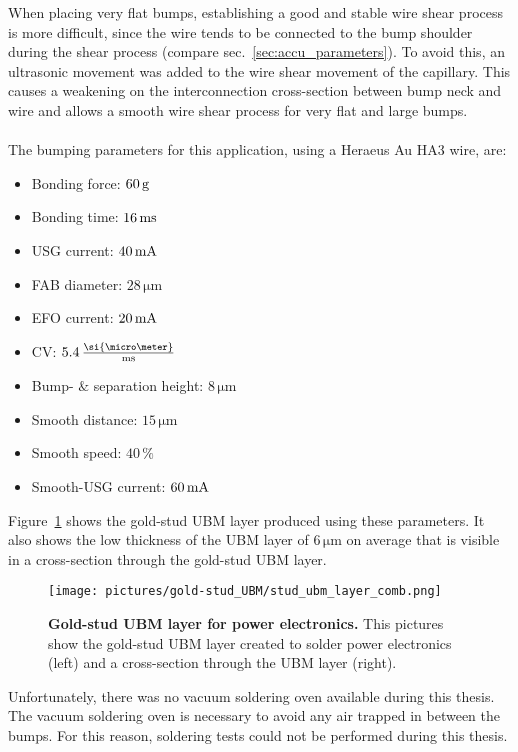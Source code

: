 When placing very flat bumps, establishing a good and stable wire shear process is more difficult, since the wire tends to be connected to the bump shoulder during the shear process (compare sec.~\ref{sec:accu_parameters}). To avoid this, an ultrasonic movement was added to the wire shear movement of the capillary. This causes a weakening on the interconnection cross-section between bump neck and wire and allows a smooth wire shear process for very flat and large bumps.\\
\\The bumping parameters for this application, using a Heraeus Au HA3 wire, are:
\begin{itemize}
\item Bonding force: $60\,\rm{g}$
\item Bonding time: $16\,\rm{ms}$
\item \ac{USG} current: $40\,\rm{mA}$
\item \ac{FAB} diameter: $28\,\si{\micro \meter}$
\item \ac{EFO} current: $20\,\rm{mA}$
\item \acl{CV}: $5.4\,\frac{\si{\micro \meter}}{\rm{ms}}$
\item Bump- $\&$ separation height: $8\,\si{\micro \meter}$
\item Smooth distance: $15\,\si{\micro \meter}$
\item Smooth speed: $40\,\%$
\item Smooth-\ac{USG} current: $60\,\rm{mA}$
\end{itemize}
Figure~\ref{pic:stud-UBM} shows the gold-stud \ac{UBM} layer produced using these parameters. It also shows the low thickness of the \ac{UBM} layer of $6\,\si{\micro \meter}$ on average that is visible in a cross-section through the gold-stud \ac{UBM} layer.
\begin{figure}
\begin{center}
\texttt{[image: pictures/gold-stud\_UBM/stud\_ubm\_layer\_comb.png]}
\end{center}
\caption[Gold-stud UBM layer for power electronics]{\textbf{Gold-stud \ac{UBM} layer for power electronics.} This pictures show the gold-stud \ac{UBM} layer created to solder power electronics (left) and a cross-section through the \ac{UBM} layer (right).}\label{pic:stud-UBM}
\end{figure}
Unfortunately, there was no vacuum soldering oven available during  this thesis. The vacuum soldering oven is necessary to avoid any air trapped in between the bumps. For this reason, soldering tests could not be performed during this thesis.



